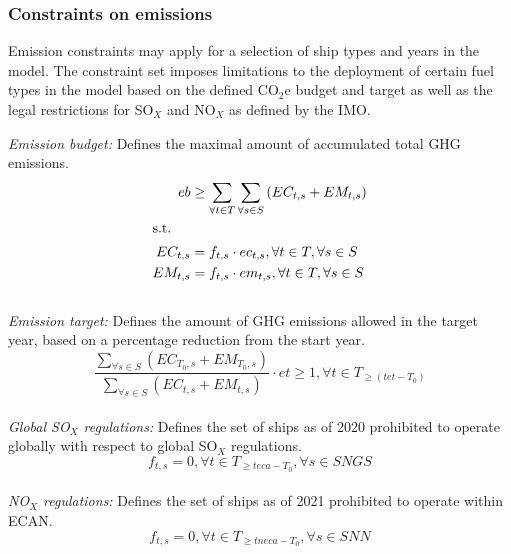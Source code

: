 \documentclass[article]{elsarticle}
\begin{document}
\subsubsection{Constraints on emissions}
\label{subsubsec:emconstraints}
Emission constraints may apply for a selection of ship types and years in the model. The constraint set imposes limitations to the deployment of certain fuel types in the model based on the defined CO$_2$e budget and target as well as the legal restrictions for SO$_X$ and NO$_X$ as defined by the IMO.
\\\par\noindent
\textit{Emission budget: }Defines the maximal amount of accumulated total GHG emissions.
\begin{subequations}
    \begin{align}
    eb &\geq \sum_{\forall t \in T}\sum_{\forall s \in S}\left(EC_{t,s} + EM_{t,s} \right) \label{eq:co2ebudget}\\
    \intertext{s.t.}
    EC_{t,s} &= f_{t,s} \cdot ec_{t,s}, \forall t \in T, \forall s \in S\\
    EM_{t,s} &= f_{t,s} \cdot em_{t,s}, \forall t \in T, \forall s \in S
    \end{align}
\end{subequations}\\
\textit{Emission target: }Defines the amount of GHG emissions allowed in the target year, based on a percentage reduction from the start year.
\begin{equation}
    \frac{\sum_{\forall s \in S} \left(EC_{T_0,s}+EM_{T_0,s}\right)}{\sum_{\forall s \in S} \left(EC_{t,s}+EM_{t,s}\right)} \cdot et \geq 1, \forall t \in T_{\geq \left(tet-T_0\right)}
\end{equation}\\
\textit{Global SO$_X$ regulations: }Defines the set of ships as of 2020 prohibited to operate globally with respect to global SO$_X$ regulations.
\begin{equation}
    f_{t,s} = 0, \forall t \in T_{\geq teca-T_0}, \forall s \in SNGS \label{eq:sox_global}
\end{equation}\\
\textit{NO$_X$ regulations: }Defines the set of ships as of 2021 prohibited to operate within ECAN.
\begin{equation}
   f_{t,s} = 0, \forall t \in T_{\geq tneca-T_0},\forall s \in SNN \label{eq:tier}
\end{equation}

\newpage
\end{document}

